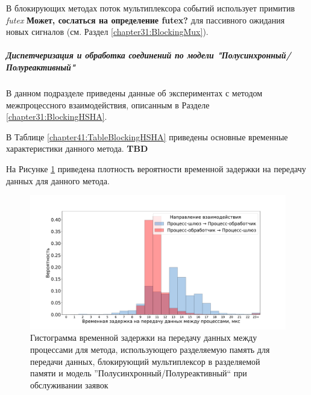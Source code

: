 В блокирующих методах поток мультиплексора событий использует примитив \textit{futex} \textbf{Может, сослаться на определение futex?} для пассивного ожидания новых сигналов (см. Раздел \ref{chapter31:BlockingMux}).

\subparagraph{Диспетчеризация и обработка соединений по модели "Полусинхронный/Полуреактивный"}

В данном подразделе приведены данные об экспериментах с методом межпроцессного взаимодействия, описанным в Разделе \ref{chapter31:BlockingHSHA}.

В Таблице \ref{chapter41:TableBlockingHSHA} приведены основные временные характеристики данного метода. \textbf{TBD}

На Рисунке \ref{chapter41:FigBlockingHSHA} приведена плотность вероятности временной задержки на передачу данных для данного метода.

\begin{figure}[!h]
\caption{Гистограмма временной задержки на передачу данных между процессами для метода, использующего разделяемую память для передачи данных, блокирующий мультиплексор в разделяемой памяти и модель ''Полусинхронный/Полуреактивный`` при обслуживании заявок}
\label{chapter41:FigBlockingHSHA}
\includegraphics[width=\textwidth]{../../graphics/hist/BlockingHSHA}
\end{figure}
%

